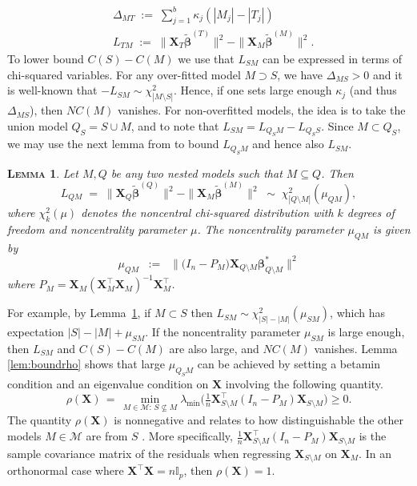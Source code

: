 \documentclass[aos]{imsart}
\theoremstyle{plain}
\newtheorem{lem}[thm]{\textsc{Lemma}}
\newcommand{\I}{\mathbb{I}}
\newcommand{\M}{\mathcal{M}}
\newcommand{\bs}{\boldsymbol}
\begin{document}
\begin{align}\label{eq:DeltaM}
&\Delta_{MT}\;:=\;\sum_{j=1}^b \kappa_j(|M_j|-|T_j|)
\\
&L_{TM}\;:=\;\|\bs X_{T}\tilde{\bs\beta}^{(T)}\|^2-\|\bs X_{M}\tilde{\bs\beta}^{(M)}\|^2.
\nonumber
\end{align}
To lower bound $C(S)-C(M)$ we use that $L_{SM}$ can be expressed in terms of chi-squared variables.
For any over-fitted model $M \supset S$, we have $\Delta_{MS}>0$ and it is well-known that $-L_{SM} \sim \chi_{|M \setminus S|}^2$. Hence, if one sets large enough $\kappa_j$ (and thus $\Delta_{MS}$), then $NC(M)$ vanishes. 
For non-overfitted  models, the idea is to take the union model $Q_S=S\cup M$, and to note that $L_{SM}=L_{Q_SM}-L_{Q_SS}$. Since $M \subset Q_S$, we may use the next lemma from \cite{rossell2022concentration} to bound $L_{Q_SM}$ and hence also $L_{SM}$.

\begin{lem}\label{lemma:s7}
    Let $M,Q$ be any two nested models such that $M \subseteq Q$. Then
$$
L_{QM}\;=\;\|\bs X_{Q}\tilde{\bs\beta}^{(Q)}\|^2-\|\bs X_{M}\tilde{\bs\beta}^{(M)}\|^2\;\sim\; \chi_{|Q\setminus M|}^2\left(\mu_{Q M}\right), 
$$
where $\chi_{k}^2(\mu)$ denotes the noncentral chi-squared distribution with $k$ degrees of freedom and noncentrality parameter $\mu$. The noncentrality parameter $\mu_{QM}$ is given by \begin{equation}\label{eq:muQM}
    \mu_{QM}\;\;:=\;\;\|\big(I_n-P_M\big) \bs X_{Q\setminus M} \bs \beta^*_{Q\setminus M}\|^2
\end{equation}
where $P_M=\bs X_{M}\left(\bs X_{M}^{\top} \bs X_{M}\right)^{-1} \bs X_{M}^{\top}$.
\end{lem}

For example, by Lemma~\ref{lemma:s7}, if $M\subset S$ then $L_{SM}\sim \chi^2_{|S|-|M|}(\mu_{SM})$, which has expectation $|S|-|M|+\mu_{SM}$.
If the noncentrality parameter $\mu_{SM}$ is large enough, then $L_{SM}$ and $C(S)-C(M)$ are also large, and $NC(M)$ vanishes. Lemma \ref{lem:boundrho} shows that large $\mu_{Q_SM}$ can be achieved by setting a betamin condition and an eigenvalue condition on $\bs X$ involving the following quantity.  
 \begin{equation}\label{eq:rhoX}
        \rho(\bs X)\,=\,\min_{M \in \M:\, S \not \subseteq M} \lambda_{\min}\big(\tfrac{1}{n} \boldsymbol{X}_{S \setminus M}^{\top}\left(I_n- P_M\right) \boldsymbol{X}_{S \setminus M}\big) \geq 0.
    \end{equation}
The quantity $\rho(\bs X)$ is nonnegative and relates to how distinguishable the other models $M\in \M$ are from $S$ \citep{infotheowainwright}.  More specifically, $\tfrac{1}{n} \boldsymbol{X}_{S \setminus M}^{\top}\left(I_n- P_M\right) \boldsymbol{X}_{S \setminus M}$ is the sample covariance matrix of the residuals when regressing $\boldsymbol{X}_{S \setminus M}$ on $\boldsymbol{X}_M$.
In an orthonormal case where $\bs X^{\top}\bs X=n\I_p$, then $\rho(\bs X)=1$.  
\end{document}
